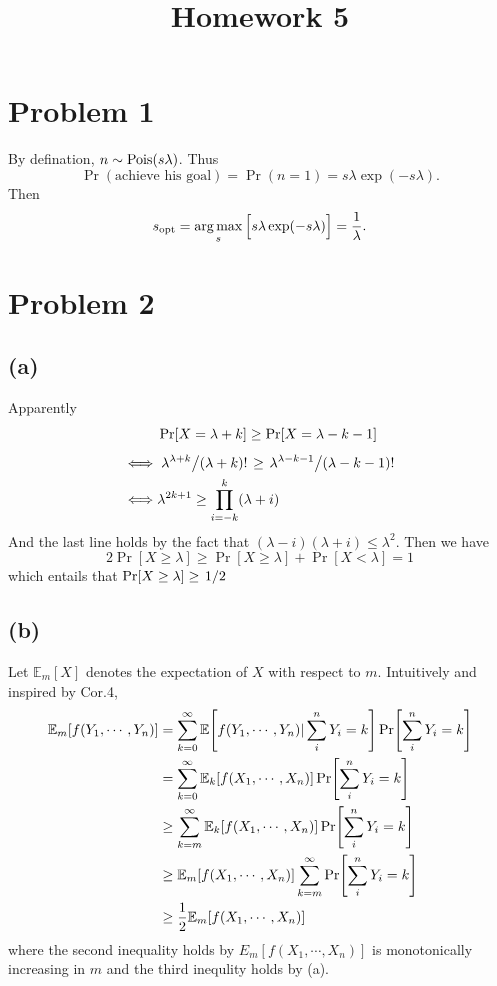 \documentclass{article}
\begin{document}
\title{Homework 5}
\maketitle

\section*{Problem 1}

By defination, $n\sim\-{Pois}(s\lambda)$. Thus
\[
	\Pr(\text{achieve his goal})=\Pr(n=1)=s\lambda\exp(-s\lambda)
.\] 
Then
\[
	s_{\-{opt}}=\argmax_s\Big[s\lambda\exp(-s\lambda)\Big]=\frac{1}{\lambda}
.\]


\section*{Problem 2}
\subsection*{(a)}
Apparently
\[
    \begin{aligned}
		&\Pr[X=\lambda+k]\ge \Pr[X=\lambda-k-1]
		\\[4pt]\iff&
		\flatfrac{\lambda^{\lambda+k}}{(\lambda+k)!}\ge
		\flatfrac{\lambda^{\lambda-k-1}}{(\lambda-k-1)!}
		\\\iff&
		\lambda^{2k+1}\ge \prod^k_{i=-k}(\lambda+i)
    \end{aligned}
\] 
And the last line holds by the fact that $(\lambda-i)(\lambda+i)\le \lambda^2$.
Then we have 
\[
	2\Pr[X\ge \lambda]\ge \Pr[X\ge \lambda]+\Pr[X<\lambda]=1
\]
which entails that $\Pr[X\ge \lambda]\ge \flatfrac{1}{2}$
\subsection*{(b)}
Let $\mathbb{E}_m[X]$ denotes the expectation of  $X$ with respect to $m$.
Intuitively and inspired by Cor.4,
\[
    \begin{aligned}
		\mathbb{E}_m[f(Y_1,\cdots,Y_n)]
		&=
		\sum^{\infty}_{k=0} 
		\mathbb{E}\qty[f(Y_1,\cdots,Y_n)|\sum^n_{i}Y_i=k]\Pr[\sum^n_{i}Y_i=k]
	    \\&=
		\sum^{\infty}_{k=0}
		\mathbb{E}_k\qty[f(X_1,\cdots,X_n)]\Pr[\sum^n_{i}Y_i=k]
		\\&\ge
		\sum^{\infty}_{k=m}
		\mathbb{E}_k\qty[f(X_1,\cdots,X_n)]\Pr[\sum^n_{i}Y_i=k]
		\\&\ge 
		\mathbb{E}_m\qty[f(X_1,\cdots,X_n)]\sum^{\infty}_{k=m}\Pr[\sum^n_{i}Y_i=k]
		\\&\ge 
		\frac{1}{2}\mathbb{E}_m\qty[f(X_1,\cdots,X_n)]
    \end{aligned}
\] 
where the second inequality holds by $E_m[f(X_1,\cdots,X_n)]$ is monotonically increasing in $m$ and the third inequlity holds by (a).
\end{document}
